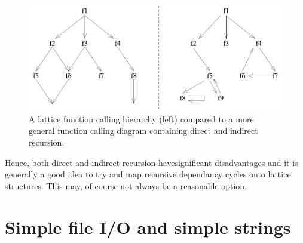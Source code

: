   \begin{figure}[htb]
    \begin{center}  
      \includegraphics{BasicCPP/Figures/Recursion.pdf}
    \end{center}  
    \caption{A lattice function calling hierarchy (left) compared to a more
              general function calling diagram containing direct and indirect
              recursion. 
             \label{figRecursion}} 
  \end{figure}


Hence, both direct and indirect recursion havesignificant disadvantages and it is generally a
good idea to try and map recursive dependancy cycles onto lattice structures. This may, of
course not always be a reasonable option.


\section{Simple file I/O and simple strings}
 

